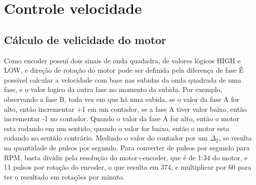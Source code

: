 
\chapter{Controle velocidade}


\section{Cálculo de velicidade do motor}

Como encoder possuí dois sinais de onda quadadra, de valores lógicos HIGH e LOW, e direção de rotação do motor pode ser definida pela diferença de fase 
É possível calcular a velocidade com base nas subidas da onda quadrada de uma fase, e o valor logico da outra fase no momento da subida.
Por exemplo,  observando a fase B, toda vez em que há uma subida, se o valor da fase A for alto, então incrementar +1 em um contador, se a fase A tiver valor baixo, então incrementar -1 no contador.
Quando o valor da fase A for alto, então o motor esta rodando em um sentido,  quando o valor  for baixo, então o motor esta rodando no sentido contrário.
Medindo o valor do contador por um $\Delta_{T}$, se resulta na quantidade de pulsos por segundo.
Para converter de pulsos por segundo para RPM, basta dividir pela resolução do motor+encoder,  que é de 1:34 do motor, e 11 pulsos por rotação do encoder, o que resulta em 374,
e multiplicar por 60 para ter o resultado em rotações por minuto.


    


